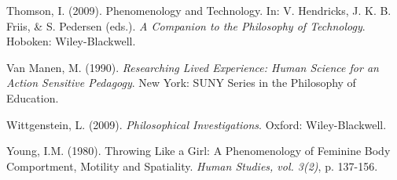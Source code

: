 \begin{thebibliography}{99}
\item Thomson, I. (2009). Phenomenology and Technology. In: V. Hendricks, J. K. B. Friis, \& S. Pedersen (eds.). \textit{A Companion to the Philosophy of Technology}. Hoboken: Wiley-Blackwell.
\item Van Manen, M. (1990). \textit{Researching Lived Experience: Human Science for an Action Sensitive Pedagogy}. New York: SUNY Series in the Philosophy of Education.
\item Wittgenstein, L. (2009). \textit{Philosophical Investigations}. Oxford: Wiley-Blackwell.
\item Young, I.M. (1980). Throwing Like a Girl: A Phenomenology of Feminine Body Comportment, Motility and Spatiality. \textit{Human Studies, vol. 3(2)}, p. 137-156.

\end{thebibliography}